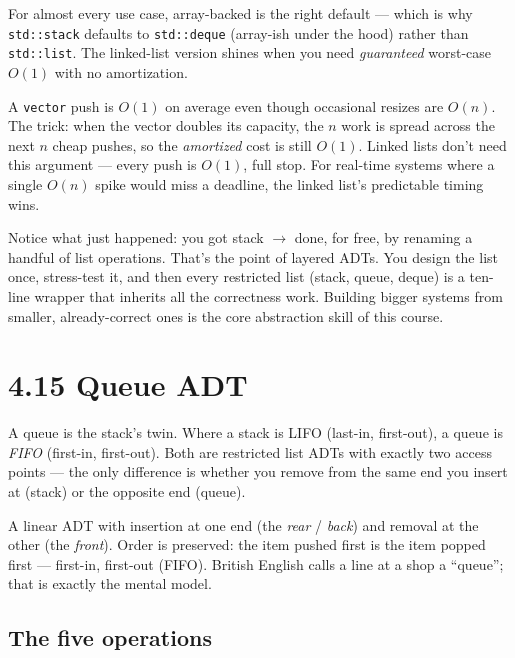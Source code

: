 \documentclass[11pt]{article}
\begin{document}
For almost every use case, array-backed is the right default ---
which is why \texttt{std::stack} defaults to \texttt{std::deque}
(array-ish under the hood) rather than \texttt{std::list}. The
linked-list version shines when you need \emph{guaranteed}
worst-case $O(1)$ with no amortization.

\begin{notebox}
A \texttt{vector} push is $O(1)$ on average even though
occasional resizes are $O(n)$. The trick: when the vector doubles
its capacity, the $n$ work is spread across the next $n$ cheap
pushes, so the \emph{amortized} cost is still $O(1)$. Linked
lists don't need this argument --- every push is $O(1)$, full
stop. For real-time systems where a single $O(n)$ spike would
miss a deadline, the linked list's predictable timing wins.
\end{notebox}

\begin{ideabox}
Notice what just happened: you got stack $\to$ done, for free,
by renaming a handful of list operations. That's the point of
layered ADTs. You design the list once, stress-test it, and then
every restricted list (stack, queue, deque) is a ten-line wrapper
that inherits all the correctness work. Building bigger systems
from smaller, already-correct ones is the core abstraction skill
of this course.
\end{ideabox}

\section{4.15 Queue ADT}

A queue is the stack's twin. Where a stack is LIFO (last-in,
first-out), a queue is \emph{FIFO} (first-in, first-out). Both
are restricted list ADTs with exactly two access points --- the
only difference is whether you remove from the same end you insert
at (stack) or the opposite end (queue).

\begin{defnbox}[Queue]
A linear ADT with insertion at one end (the \emph{rear} /
\emph{back}) and removal at the other (the \emph{front}). Order
is preserved: the item pushed first is the item popped first ---
first-in, first-out (FIFO). British English calls a line at a
shop a ``queue''; that is exactly the mental model.
\end{defnbox}

\subsection*{The five operations}
\end{document}
